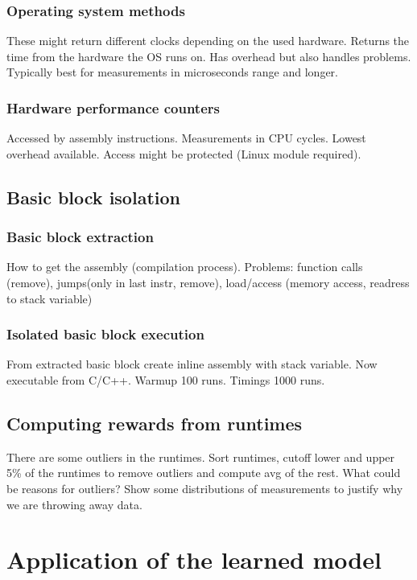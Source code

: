 \subsubsection{Operating system methods}
These might return different clocks depending on the used hardware.
Returns the time from the hardware the OS runs on.
Has overhead but also handles problems.
Typically best for measurements in microseconds range and longer.
\subsubsection{Hardware performance counters}
Accessed by assembly instructions.
Measurements in CPU cycles.
Lowest overhead available.
Access might be protected (Linux module required).
\subsection{Basic block isolation}
\subsubsection{Basic block extraction}
How to get the assembly (compilation process).
Problems: function calls (remove), jumps(only in last instr, remove), load/access (memory access, readress to stack variable)
\subsubsection{Isolated basic block execution}
From extracted basic block create inline assembly with stack variable. Now executable from C/C++.
Warmup 100 runs. Timings 1000 runs. 
\subsection{Computing rewards from runtimes}
There are some outliers in the runtimes. Sort runtimes, cutoff lower and upper 5\% of the runtimes to remove outliers and compute avg of the rest.
What could be reasons for outliers?
Show some distributions of measurements to justify why we are throwing away data.

\section{Application of the learned model}
\label{sec:approach:ml-scheduler}

